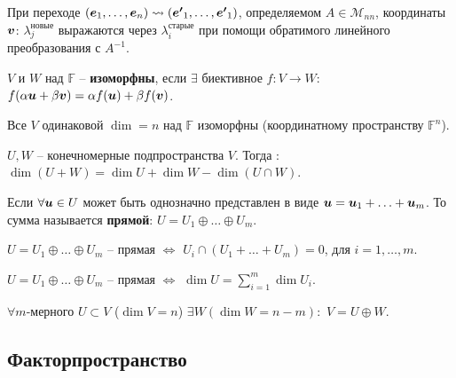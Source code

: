 \begin{to_thr}
	При переходе $(\mbox{\boldmath $e$}_1,\ldots,\mbox{\boldmath $e$}_n) \leadsto ( \mbox{\boldmath $e'$}_1,\ldots,\mbox{\boldmath $e'$}_1)$, определяемом $A \in \mathcal{M}_{n n}$, координаты $\mbox{\boldmath $v$}$: $\lambda_j^\text{новые}$ выражаются через $\lambda_i^\text{старые}$ при помощи обратимого линейного преобразования с $A^{-1}$.
	\label{transition_matrix}
\end{to_thr}

\begin{to_def}
	$V$ и $W$ над $\mathbb{F}$ -- \textbf{изоморфны}, если  $\exists$ биективное $f \colon V \to W:$ $f(\alpha \mbox{\boldmath $u$} + \beta \mbox{\boldmath $v$}) = \alpha f(\mbox{\boldmath $u$}) + \beta f(\mbox{\boldmath $v$})$.
\end{to_def}

\begin{to_thr}
	Все $V$ одинаковой $\dim = n$ над $\mathbb{F}$ изоморфны (координатному пространству $\mathbb{F}^n$).
\end{to_thr}

\begin{to_thr}
	$U, W$ -- конечномерные подпространства $V$. Тогда : $\dim(U + W) = \dim U + \dim W - \dim(U \cap W)$.
\end{to_thr}

\begin{to_def}
	Если $\forall \mbox{\boldmath $u$} \in U$ может быть однозначно представлен в виде $\mbox{\boldmath $u$} = \mbox{\boldmath $u$}_1 + \ldots + \mbox{\boldmath $u$}_m$. То сумма называется \textbf{прямой}: $U = U_1 \oplus \ldots \oplus U_m$.
\end{to_def}

\begin{to_thr}
	$U = U_1 \oplus \ldots \oplus U_m$ -- прямая $\Longleftrightarrow$ $U_i \cap (U_1 + \ldots + U_m) = 0$, для  $i=1, \ldots, m$.
\end{to_thr}

\begin{to_thr}
	$U = U_1 \oplus \ldots \oplus U_m$ -- прямая $\Longleftrightarrow$ $\dim U = \sum\limits_{ i=1 }^{ m } \dim U_i$.
\end{to_thr}

\begin{to_thr}
	$\forall m$-мерного $U \subset V$ ($\dim V = n$) $\exists W (\dim W = n-m):$ $V = U \oplus W$.
\end{to_thr}


\subsection{Факторпространство}

